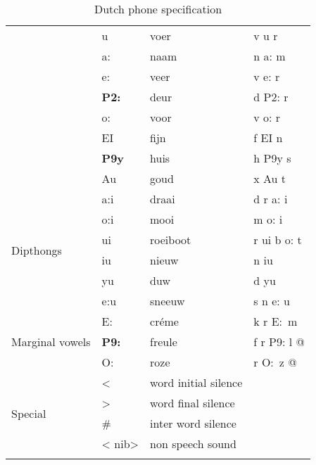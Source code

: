 {\begin{longtable}{l|l|l|l}
	& u & voer & v u r\\
	& a: & naam & n a: m\\
	& e: & veer & v e: r\\
	& \textbf{P2:} & deur & d P2: r\\
	& o: & voor & v o: r\\
	& EI & fijn & f EI n\\
	& \textbf{P9y} &huis & h P9y s\\
	& Au & goud & x Au t\\
	\midrule
	\multirow{6}{*}{Dipthongs} &
	a:i & draai & d r a: i\\
	& o:i &mooi & m o: i\\
	& ui & roeiboot & r ui b o: t\\
	& iu & nieuw & n iu\\
	& yu & duw & d yu\\
	& e:u & sneeuw & s n e: u\\
	\midrule
	\multirow{3}{*}{Marginal vowels} &
	E:\ & cr\'eme & k r E:\ m\\
	& \textbf{P9:} & freule & f r P9: l @\\
	& O:\ & roze & r O:\ z @\\
	\midrule
	\multirow{4}{*}{Special} &
	\textless{} & word initial silence & \\
	& \textgreater{} & word final silence & \\
	& \# & inter word silence & \\
	& \textless{} nib\textgreater{} & non speech sound & \\
	\bottomrule
	\caption{Dutch phone specification}
\end{longtable}
}

